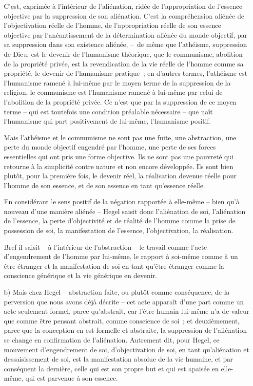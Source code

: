 \documentclass[french,twoside]{book} %
\begin{document}
\noindent C’est, exprimée à l’intérieur de l’aliénation, ridée de l’appropriation de l’essence objective par la suppression de son aliénation. C’est la compréhension aliénée de l’objectivation réelle de l’homme, de l’appropriation réelle de son essence objective par l’anéantissement de la détermination aliénée du monde objectif, par sa suppression dans son existence aliénée, – de même que l’athéisme, suppression de Dieu, est le devenir de l’humanisme théorique, que le communisme, abolition de la propriété privée, est la revendication de la vie réelle de l’homme comme sa propriété, le devenir de l’humanisme pratique ; en d’autres termes, l’athéisme est l’humanisme ramené à lui-même par le moyen terme de la suppression de la religion, le communisme est l’humanisme ramené à lui-même par celui de l’abolition de la propriété privée. Ce n’est que par la suppression de ce moyen terme – qui est toutefois une condition préalable nécessaire – que naît l’humanisme qui part positivement de lui-même, l’humanisme positif.\par
Mais l’athéisme et le communisme ne sont pas une fuite, une abstraction, une perte du monde objectif engendré par l’homme, une perte de ses forces essentielles qui ont pris une forme objective. Ils ne sont pas une pauvreté qui retourne à la simplicité contre nature et non encore développée. Ils sont bien plutôt, pour la première fois, le devenir réel, la réalisation devenue réelle pour l’homme de son essence, et de son essence en tant qu’essence réelle.\par
En considérant le sens positif de la négation rapportée à elle-même – bien qu’à nouveau d’une manière aliénée – Hegel saisit donc l’aliénation de soi, l’aliénation de l’essence, la perte d’objectivité et de réalité de l’homme comme la prise de possession de soi, la manifestation de l’essence, l’objectivation, la réalisation.\par
Bref il saisit – à l’intérieur de l’abstraction – le travail comme l’acte d’engendrement de l’homme par lui-même, le rapport à soi-même comme à un être étranger et la manifestation de soi en tant qu’être étranger comme la conscience générique et la vie générique en devenir.\par
b) Mais chez Hegel – abstraction faite, ou plutôt comme conséquence, de la perversion que nous avons déjà décrite – cet acte apparaît d’une part comme un acte seulement formel, parce qu’abstrait, car l’être humain lui-même n’a de valeur que comme être pensant abstrait, comme conscience de soi ; et deuxièmement, parce que la conception en est formelle et abstraite, la suppression de l’aliénation se change en confirmation de l’aliénation. Autrement dit, pour Hegel, ce mouvement d’engendrement de soi, d’objectivation de soi, en tant qu’aliénation et dessaisissement de soi, est la manifestation absolue de la vie humaine, et par conséquent la dernière, celle qui est son propre but et qui est apaisée en elle-même, qui est parvenue à son essence.\par
\end{document}

